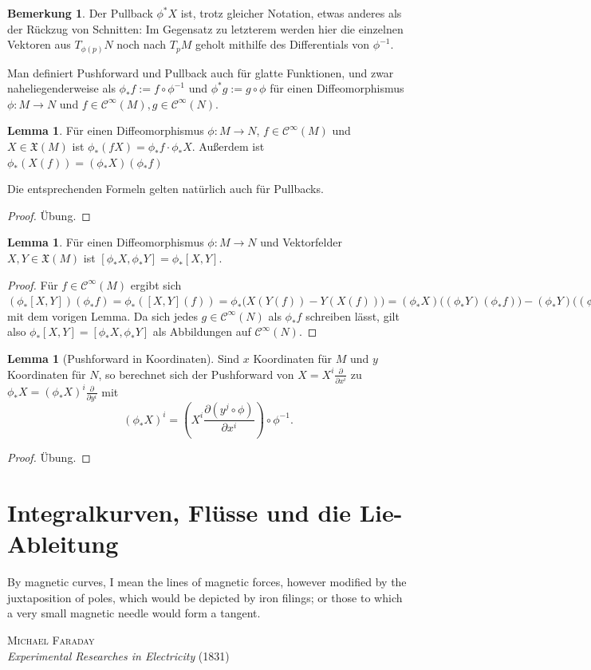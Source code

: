\documentclass[a4paper]{scrbook}
\numberwithin{equation}{chapter}
\newcommand{\sC}{\mathcal{C}^{\infty}}
\theoremstyle{definition}
\newtheorem{lemma}[defn]{Lemma}
\newtheorem{bem}[defn]{Bemerkung}
\newcommand{\bewUeb}{\begin{proof}Übung.\end{proof}}
\begin{document}
\begin{bem}
	Der Pullback $\phi^*X$ ist, trotz gleicher Notation, etwas anderes als der Rückzug von Schnitten: Im Gegensatz zu letzterem werden hier die einzelnen Vektoren aus $T_{\phi(p)}N$ noch nach $T_pM$ geholt mithilfe des Differentials von $\phi^{-1}$.
\end{bem}

Man definiert Pushforward und Pullback auch für glatte Funktionen, und zwar naheliegenderweise als $\phi_*f := f \circ \phi^{-1}$ und $\phi^*g := g \circ \phi$ für einen Diffeomorphismus $\phi\colon M \to N$ und $f \in \sC(M), g \in \sC(N)$.

\begin{lemma} \label{lemma:transport_VF_funk}
	Für einen Diffeomorphismus $\phi\colon M \to N$, $f \in \sC(M)$ und $X \in \mathfrak X(M)$ ist $\phi_*(f X) = \phi_*f \cdot \phi_*X$. Außerdem ist $\phi_*(X(f)) = (\phi_*X)(\phi_*f)$

	Die entsprechenden Formeln gelten natürlich auch für Pullbacks.
	\bewUeb
\end{lemma}

\begin{lemma}
	Für einen Diffeomorphismus $\phi\colon M \to N$ und Vektorfelder $X, Y \in \mathfrak X(M)$ ist $[\phi_*X,\phi_*Y] = \phi_*[X,Y]$.

	\begin{proof}
		Für $f \in \sC(M)$ ergibt sich $(\phi_*[X,Y])(\phi_*f) = \phi_*([X,Y](f)) = \phi_*\Big(X(Y(f)) - Y(X(f))\Big) = (\phi_*X)\Big((\phi_*Y)(\phi_*f)\Big) - (\phi_*Y)\Big((\phi_*X)(\phi_*f)\Big) = [\phi_*X,\phi_*Y](\phi_*f)$ mit dem vorigen Lemma. Da sich jedes $g\in \sC(N)$ als $\phi_*f$ schreiben lässt, gilt also $\phi_*[X,Y] = [\phi_*X,\phi_*Y]$ als Abbildungen auf $\sC(N)$.
	\end{proof}
\end{lemma}

\begin{lemma}[Pushforward in Koordinaten]
	Sind $x$ Koordinaten für $M$ und $y$ Koordinaten für $N$, so berechnet sich der Pushforward von $X = X^i \frac{\partial}{\partial x^i}$ zu $\phi_*X = (\phi_*X)^i \frac{\partial}{\partial y^i}$ mit
	\[(\phi_*X)^i = \left(X^i \frac{\partial (y^j \circ \phi)}{\partial x^i}\right) \circ \phi^{-1}.\]
	\bewUeb
\end{lemma}

\section{Integralkurven, Flüsse und die Lie-Ableitung}
\epigraph{By magnetic curves, I mean the lines of magnetic forces, however modified by the juxtaposition of poles, which would be depicted by iron filings; or those to which a very small magnetic needle would form a tangent.}
{\textsc{Michael Faraday}\\\emph{Experimental Researches in Electricity} (1831)}
\end{document}
